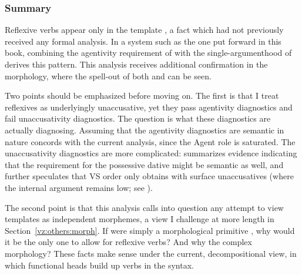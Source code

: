 {	\subsubsection{Summary} \label{vz:va:refl:sum}
Reflexive verbs appear only in the template {\thit}, a fact which had not previously received any formal analysis. In a system such as the one put forward in this book, combining the agentivity requirement of {\va} with the single-argumenthood of {\vz} derives this pattern. This analysis receives additional confirmation in the morphology, where the spell-out of both {\va} and {\vz} can be seen.

Two points should be emphasized before moving on. The first is that I treat reflexives as underlyingly unaccusative, yet they pass agentivity diagnostics and fail unaccusativity diagnostics. The question is what these diagnostics are actually diagnosing. Assuming that the agentivity diagnostics are semantic in nature concords with the current analysis, since the Agent role is saturated. The unaccusativity diagnostics are more complicated: \cite{kastner17gjgl} summarizes evidence indicating that the requirement for the possessive dative might be semantic as well, and further speculates that VS order only obtains with surface unaccusatives (where the internal argument remains low; see \citealt{unaccusativity95}).

The second point is that this analysis calls into question any attempt to view templates as independent morphemes, a view I challenge at more length in Section~\ref{vz:others:morph}. If {\thit} were simply a morphological primitive \citep{reinhartsiloni05}, why would it be the only one to allow for reflexive verbs? And why the complex morphology? These facts make sense under the current, decompositional view, in which functional heads build up verbs in the syntax.


}
